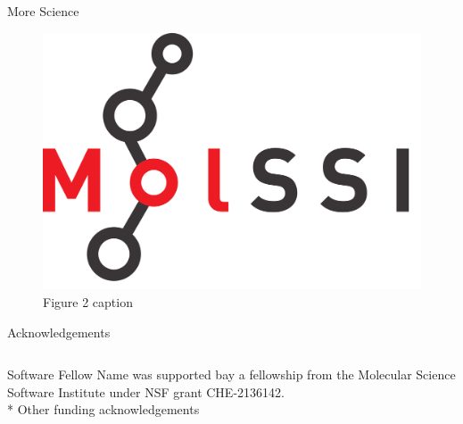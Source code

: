 \documentclass{beamer}
\begin{document}
\begin{frame}
\begin{columns}[t]
\begin{column}{.417\linewidth}
        \begin{section}{More Science}
          \lipsum[1-4]

          \begin{figure}[h]
            \includegraphics[width=0.65\linewidth]{./images/molssi_main_logo.png}
            \caption{Figure 2 caption}
          \end{figure}
        \end{section}

        \begin{section}{Acknowledgements}
          \begin{columns}
            \begin{column}{.75\linewidth}
            Software Fellow Name was supported bay a fellowship from the Molecular Science Software Institute under NSF grant  CHE-2136142.\\
* Other funding acknowledgements
            \end{column}
            \begin{column}{.2\linewidth}
              \includegraphics[width=0.9\linewidth]./images/nsf.png}
            \end{column}
          \end{columns}

        \end{section} 

      \end{column}

    \end{columns}

  \end{frame}
\end{document}
